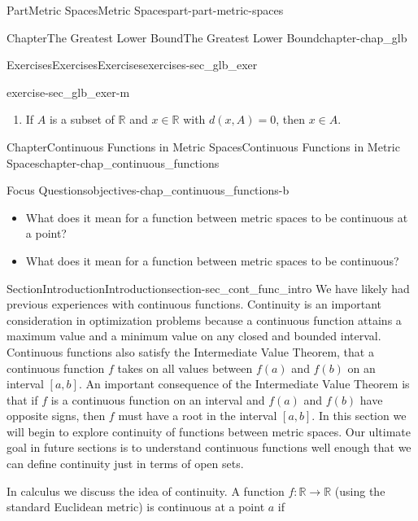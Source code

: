 \documentclass[oneside,10pt,]{book}
\numberwithin{equation}{chapter}
\newcommand{\R}{\mathbb{R}}
\begin{document}
\begin{partptx}{Part}{Metric Spaces}{}{Metric Spaces}{}{}{part-part-metric-spaces}
\begin{chapterptx}{Chapter}{The Greatest Lower Bound}{}{The Greatest Lower Bound}{}{}{chapter-chap_glb}
\begin{exercises-section}{Exercises}{Exercises}{}{Exercises}{}{}{exercises-sec_glb_exer}
\begin{divisionexercise}{13}{}{}{exercise-sec_glb_exer-m}
\begin{enumerate}[font=\bfseries,label=(\alph*),ref=\alph*]
\item{}If \(A\) is a subset of \(\R\) and \(x \in \R\) with \(d(x,A) = 0\), then \(x \in A\).%
\end{enumerate}%
\end{divisionexercise}%
\end{exercises-section}
\end{chapterptx}
%
\typeout{************************************************}
\typeout{************************************************}
%
\begin{chapterptx}{Chapter}{Continuous Functions in Metric Spaces}{}{Continuous Functions in Metric Spaces}{}{}{chapter-chap_continuous_functions}
\renewcommand*{\chaptername}{Chapter}
\begin{objectives}{Focus Questions}{objectives-chap_continuous_functions-b}
%
\begin{itemize}[label=\textbullet]
\item{}What does it mean for a function between metric spaces to be continuous at a point?%
\item{}What does it mean for a function between metric spaces to be continuous?%
\end{itemize}
\end{objectives}
%
%
\typeout{************************************************}
\typeout{************************************************}
%
\begin{sectionptx}{Section}{Introduction}{}{Introduction}{}{}{section-sec_cont_func_intro}
We have likely had previous experiences with continuous functions. Continuity is an important consideration in optimization problems because a continuous function attains a maximum value and a minimum value on any closed and bounded interval. Continuous functions also satisfy the Intermediate Value Theorem, that a continuous function \(f\) takes on all values between \(f(a)\) and \(f(b)\) on an interval \([a,b]\). An important consequence of the Intermediate Value Theorem is that if \(f\) is a continuous function on an interval and \(f(a)\) and \(f(b)\) have opposite signs, then \(f\) must have a root in the interval \([a,b]\). In this section we will begin to explore continuity of functions between metric spaces. Our ultimate goal in future sections is to understand continuous functions well enough that we can define continuity just in terms of open sets.%
\par
In calculus we discuss the idea of continuity. A function \(f:\R \to \R\) (using the standard Euclidean metric) is continuous at a point \(a\) if%

\end{sectionptx}
\end{chapterptx}
\end{partptx}
\end{document}
